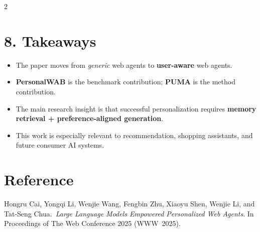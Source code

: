 \documentclass{article}
\begin{document}
\begin{multicols}{2}
\section*{8. Takeaways}
\begin{tcolorbox}[colback=green!4,colframe=green!40!black,title=What to remember]
\begin{itemize}[leftmargin=1.1em,itemsep=0.2em,topsep=0.2em]
	\item The paper moves from \emph{generic} web agents to \textbf{user-aware} web agents.
	\item \textbf{PersonalWAB} is the benchmark contribution; \textbf{PUMA} is the method contribution.
	\item The main research insight is that successful personalization requires \textbf{memory retrieval + preference-aligned generation}.
	\item This work is especially relevant to recommendation, shopping assistants, and future consumer AI systems.
\end{itemize}
\end{tcolorbox}

\section*{Reference}
Hongru Cai, Yongqi Li, Wenjie Wang, Fengbin Zhu, Xiaoyu Shen, Wenjie Li, and Tat-Seng Chua.\ \emph{Large Language Models Empowered Personalized Web Agents}. In Proceedings of The Web Conference 2025 (WWW~2025).

\end{multicols}
\end{document}
